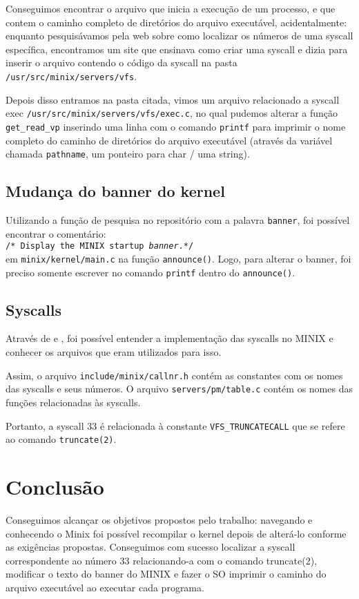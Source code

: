 \documentclass[12pt,journal,compsoc]{IEEEtran}
\begin{document}
Conseguimos encontrar o arquivo que inicia a execução de um processo, e que contem o caminho completo de diretórios do arquivo executável,  acidentalmente: enquanto pesquisávamos pela web sobre como localizar os números de uma syscall específica, encontramos um site\cite{instalacaoSyscall:puc-rio} que ensinava como criar uma syscall e dizia para inserir o arquivo contendo o código da syscall na pasta \texttt{/usr/src/minix/servers/vfs}.

Depois disso entramos na pasta citada, vimos um arquivo relacionado a syscall exec  \texttt{/usr/src/minix/servers/vfs/exec.c}, no qual pudemos alterar a fun\c{c}ão \texttt{get\_read\_vp} inserindo uma linha com o comando \texttt{printf} para imprimir o nome completo do caminho de diretórios do arquivo executável (através da variável chamada \texttt{pathname}, um ponteiro para char / uma string).

\subsection{Mudança do banner do kernel}

Utilizando a função de pesquisa no repositório com a palavra \texttt{banner}, foi possível encontrar o comentário:\\
\texttt{/* Display the MINIX startup \textit{banner}.*/}\\
em \texttt{minix/kernel/main.c} na função \texttt{announce()}.
Logo, para alterar o banner, foi preciso somente escrever no comando \texttt{printf} dentro do \texttt{announce()}.

\subsection{Syscalls}
Através de \cite{minixSyscalls:github} e \cite{minixSyscalls:Karthick}, foi possível entender a implementação das syscalls no MINIX e conhecer os arquivos que eram utilizados para isso.

Assim, o arquivo \texttt{include/minix/callnr.h} contém as constantes com os nomes das syscalls e seus números. O arquivo \texttt{servers/pm/table.c} contém os nomes das funções relacionadas às syscalls.

Portanto, a syscall 33 é relacionada à constante \texttt{VFS\_TRUNCATECALL}  que se refere ao comando \texttt{truncate(2)}.

\section{Conclusão}
Conseguimos alcan\c{c}ar os objetivos propostos pelo trabalho: navegando e conhecendo o Minix foi possível recompilar o kernel depois de alterá-lo conforme as exigências propostas. Conseguimos com sucesso localizar a syscall correspondente ao número 33 relacionando-a com o comando truncate(2), modificar o texto do banner do MINIX e fazer o SO imprimir o caminho do arquivo executável ao executar cada programa.
\end{document}
